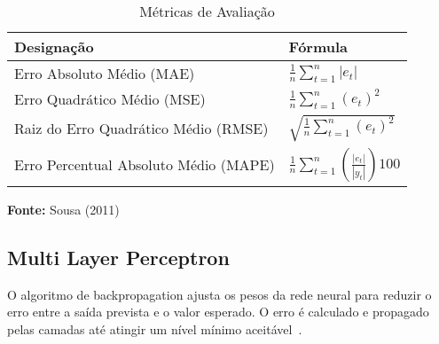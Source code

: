             \begin{center}
                \begin{table}[h!]
                    \centering
                    \caption{Métricas de Avaliação}
                    \label{tab:calculo_erros}
                    \begin{tabular}{ll}
                        \toprule
                        \textbf{Designação} & \textbf{Fórmula} \\ 
                        \midrule
                        Erro Absoluto Médio (MAE) & $\frac{1}{n} \sum_{t=1}^{n} |e_t|$ \\[8pt]
                        Erro Quadrático Médio (MSE) & $\frac{1}{n} \sum_{t=1}^{n} (e_t)^2$ \\[8pt]
                        Raiz do Erro Quadrático Médio (RMSE) & $\sqrt{\frac{1}{n} \sum_{t=1}^{n} (e_t)^2}$ \\[8pt]
                        Erro Percentual Absoluto Médio (MAPE) & $\frac{1}{n} \sum_{t=1}^{n} \left(\frac{|e_t|}{|y_t|}\right) 100$ \\ 
                        \bottomrule
                    \end{tabular}
                    
                    \bigskip
                    \small \textbf{Fonte:} Sousa (2011)
                    \label{fig:tabela-metricas}
                \end{table}
            \end{center}
            
            
    \subsection{Multi Layer Perceptron}
        O algoritmo de backpropagation ajusta os pesos da rede neural para reduzir o erro entre a saída prevista 
        e o valor esperado. O erro é calculado e propagado pelas camadas até atingir um nível mínimo aceitável~\cite{marangoni2010}.
        
